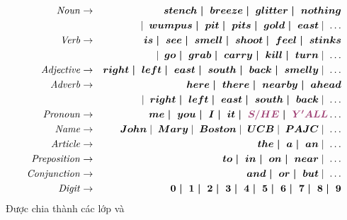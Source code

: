 \documentclass{article}
\begin{document}
\begin{huge}
\begin{eqnarray*}
\bnf{Noun} & \bnfeq & \bnft{stench \bnfor breeze \bnfor glitter \bnfor nothing} \\
        & &\bnfor \bnft{wumpus \bnfor pit \bnfor pits\bnfor gold \bnfor east} \bnfor \ldots \\
\bnf{Verb} & \bnfeq & \bnft{is \bnfor see \bnfor smell \bnfor shoot \bnfor feel \bnfor stinks}\\
        & &\bnfor \bnft{go \bnfor grab \bnfor carry \bnfor kill \bnfor turn} \bnfor \ldots \\
\bnf{Adjective} & \bnfeq & \bnft{right \bnfor left \bnfor east \bnfor south \bnfor back \bnfor smelly} \bnfor \ldots \\
\bnf{Adverb} & \bnfeq & \bnft{here \bnfor there \bnfor nearby \bnfor ahead} \\
        &&\bnfor \bnft{right \bnfor left \bnfor east \bnfor south \bnfor back} \bnfor \ldots \\
\bnf{Pronoun} & \bnfeq & \bnft{me \bnfor you \bnfor I \bnfor it \bnfor \mat{S/HE} \bnfor \mat{Y'ALL}} \ldots \\
\bnf{Name} & \bnfeq & \bnft{John} \bnfor \bnft{Mary} \bnfor \bnft{Boston}
	\bnfor \bnft{UCB} \bnfor \bnft{PAJC} \bnfor \ldots \\
\bnf{Article} & \bnfeq & \bnft{the \bnfor a \bnfor an} \bnfor \ldots \\
\bnf{Preposition} & \bnfeq & \bnft{to \bnfor in \bnfor on \bnfor near} \bnfor \ldots \\
\bnf{Conjunction} & \bnfeq & \bnft{and \bnfor or \bnfor but} \bnfor \ldots \\
\bnf{Digit} & \bnfeq & \bnft{0\bnfor 1\bnfor 2\bnfor 3\bnfor 4\bnfor 5\bnfor 6\bnfor 7\bnfor 8\bnfor 9}
\end{eqnarray*}
Được chia thành các lớp  và 


\vspace*{-0.2in}


\end{huge}
\end{document}

